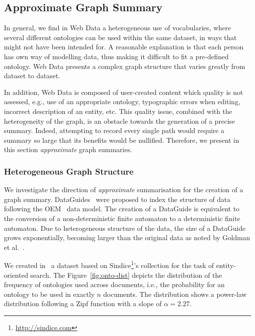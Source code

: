 \subsection{Approximate Graph Summary}
\label{sec:approximate}

In general, we find in Web Data a heterogeneous use of vocabularies, where several different ontologies can be used within the same dataset, in ways that might not have been intended for. A reasonable explanation is that each person has own way of modelling data, thus making it difficult to fit a pre-defined ontology. Web Data presents a complex graph structure that varies greatly from dataset to dataset.

In addition, Web Data is composed of user-created content which quality is not assessed, e.g., use of an appropriate ontology, typographic errors when editing, incorrect description of an entity, etc. This quality issue, combined with the heterogeneity of the graph, is an obstacle towards the generation of a precise summary. Indeed, attempting to record every single path would require a summary so large that its benefits would be nullified. Therefore, we present in this section \emph{approximate} graph summaries.

\subsubsection{Heterogeneous Graph Structure}

We investigate the direction of \emph{approximate} summarisation for the creation of a graph summary. DataGuides~\cite{goldman1997dataguides} were proposed to index the structure of data following the OEM~\cite{papakonstantinou:1995:oea} data model.
The creation of a DataGuide is equivalent to the conversion of a non-deterministic finite automaton to a deterministic finite automaton.
Due to heterogeneous structure of the data, the size of a DataGuide grows exponentially, becoming larger than the original data as noted by Goldman et al.~\cite{goldman1999approximate}.

We created in~\cite{campinas:2011:eos} a dataset based on Sindice\footnote{\url{http://sindice.com}}'s collection for the task of entity-oriented search. The Figure~\ref{fig:onto-dist} depicts the distribution of the frequency of ontologies used across documents, i.e., the probability for an ontology to be used in exactly $n$ documents. The distribution shows a power-law distribution following a Zipf function with a slope of $\alpha = 2.27$.

